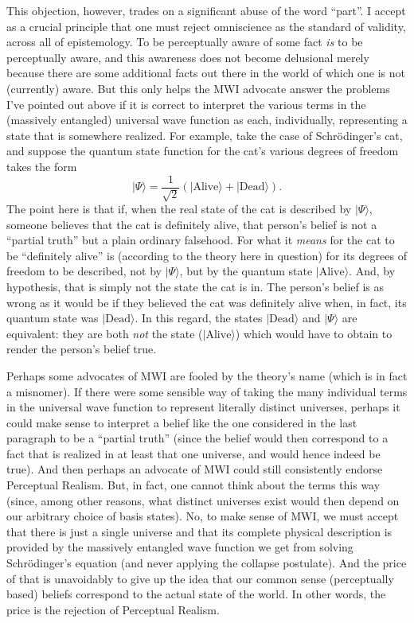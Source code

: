 \documentclass[12pt]{article}
\begin{document}
This objection, however, trades on 
a significant abuse of the word ``part''.  I accept as
a crucial principle that one must reject omniscience as the standard
of validity, across all of epistemology.
To be perceptually aware of
some fact \emph{is} to be perceptually aware, and this awareness does not
become delusional merely because there are some additional facts out
there in the world of which one is not (currently) aware.  But this 
only helps the MWI advocate answer the problems I've pointed out above
if it is correct to interpret the various terms in the (massively 
entangled) universal wave function as each,  individually,
representing a state that is somewhere realized.  For example, take
the case of Schr\"odinger's cat, and suppose the quantum state 
function for the cat's various degrees of freedom takes the form
\begin{equation}
|\Psi \rangle = \frac{1}{\sqrt{2}} \left( |{\mathrm{Alive}}\rangle +
 |{\mathrm{Dead}}\!\rangle \right).
\end{equation}
The point here is that if, when the real state of the cat is 
described by $|\Psi\rangle$, someone believes that the cat is definitely
alive, that person's belief is not a ``partial truth'' but a plain
ordinary falsehood.  For what it \emph{means} for the cat to be
``definitely alive'' is (according to the theory here in question)
for its degrees of freedom to be described, not by $|\Psi\rangle$, but
by the quantum state $|{\mathrm{Alive}}\rangle$.  And, by hypothesis,
that is simply not the state the cat is in.  The person's belief is as
wrong as it would be if they believed the cat was definitely alive
when, in fact, its quantum state was $|{\mathrm{Dead}}\rangle$.  In this
regard, the states $|{\mathrm{Dead}}\rangle$ and $|\Psi\rangle$ are equivalent:
they are both \emph{not} the state ($|{\mathrm{Alive}}\rangle$) which
would have to obtain to render the person's belief true.

Perhaps some advocates of MWI are fooled by the theory's name
(which is in fact a misnomer).  If there were some sensible  way of taking
the many individual terms in the universal wave function to represent
literally distinct universes, perhaps it could make sense to interpret
a belief like the one considered in the last paragraph to be a
``partial truth'' (since the belief would then correspond to a fact
that is realized in at least that one universe, and would hence indeed 
be true).  And then perhaps
an advocate of MWI could still consistently endorse Perceptual Realism.
But, in fact, one cannot think about the terms this way (since, among
other reasons, what distinct universes exist would then depend on our
arbitrary choice of basis states).  No, to make sense of MWI, we must
accept that there is just a single universe and that its complete
physical description is provided by the massively entangled wave
function we get from solving Schr\"odinger's equation (and never
applying the collapse postulate).  And the price of that is
unavoidably to give up the idea that our common sense (perceptually
based) beliefs correspond to the actual state of the world.  In other
words, the price is the rejection of Perceptual Realism.
\end{document}
